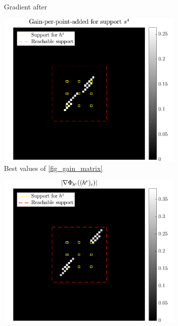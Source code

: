 \begin{figure}[!ht]
\begin{subfigure}[b]{0.32\linewidth}
\caption{Gradient after} \label{fig_grad_after}
\end{subfigure}
\begin{subfigure}[b]{0.32\linewidth}\centering
\includegraphics[width=\linewidth]{figures/before_after/xp_128x128_sc2_angl1_K3_S3_node4before_objmatrix_bestvalues.pdf}
\caption{Best values of \ref{fig_gain_matrix}}
\end{subfigure}
\begin{subfigure}[b]{0.32\linewidth}\centering
\includegraphics[width=\linewidth]{figures/before_after/xp_128x128_sc2_angl1_K3_S3_node4before_partgrad4_bestvalues.pdf}

\end{subfigure}
\end{figure}
